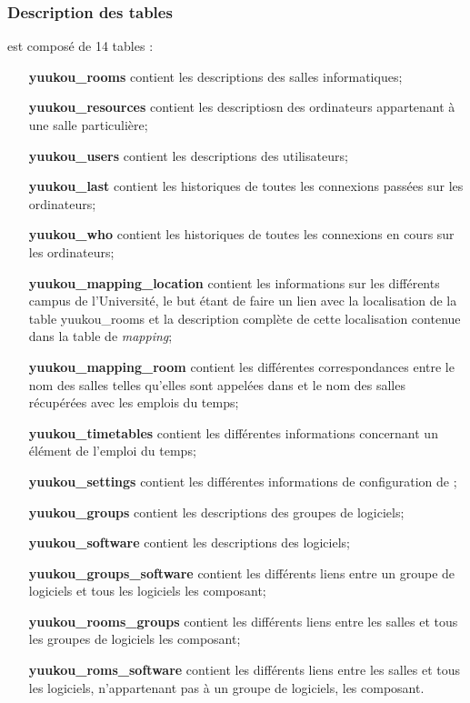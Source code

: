 \begin{appendices}
\subsubsection{Description des tables}

\noindent {\YuukouII} est compos\'e de 14 tables :

\begin{itemize}
	\item[\textbf{\textsf{yuukou\_rooms}}] contient les descriptions des salles informatiques;
	\item[\textbf{\textsf{yuukou\_resources}}] contient les descriptiosn des ordinateurs appartenant \`a une salle particuli\`ere;
	\item[\textbf{\textsf{yuukou\_users}}] contient les descriptions des utilisateurs;
	\item[\textbf{\textsf{yuukou\_last}}] contient les historiques de toutes les connexions pass\'ees sur les ordinateurs;
	\item[\textbf{\textsf{yuukou\_who}}] contient les historiques de toutes les connexions en cours sur les ordinateurs;
	\item[\textbf{\textsf{yuukou\_mapping\_location}}] contient les informations sur les diff\'erents campus de l'Universit\'e, le but \'etant de faire un lien avec la localisation de la table \textsf{yuukou\_rooms} et la description compl\`ete de cette localisation contenue dans la table de \textit{mapping};
	\item[\textbf{\textsf{yuukou\_mapping\_room}}] contient les diff\'erentes correspondances entre le nom des salles telles qu'elles sont appel\'ees dans {\YuukouII} et le nom des salles r\'ecup\'er\'ees avec les emplois du temps;
	\item[\textbf{\textsf{yuukou\_timetables}}] contient les diff\'erentes informations concernant un \'el\'ement de l'emploi du temps;
	\item[\textbf{\textsf{yuukou\_settings}}] contient les diff\'erentes informations de configuration de \YuukouII;
	\item[\textbf{\textsf{yuukou\_groups}}] contient les descriptions des groupes de logiciels;
	\item[\textbf{\textsf{yuukou\_software}}] contient les descriptions des logiciels;
	\item[\textbf{\textsf{yuukou\_groups\_software}}] contient les diff\'erents liens entre un groupe de logiciels et tous les logiciels les composant;
	\item[\textbf{\textsf{yuukou\_rooms\_groups}}] contient les diff\'erents liens entre les salles et tous les groupes de logiciels les composant;
	\item[\textbf{\textsf{yuukou\_roms\_software}}] contient les diff\'erents liens entre les salles et tous les logiciels, n'appartenant pas \`a un groupe de logiciels, les composant.
	

\end{itemize}
\end{appendices}
